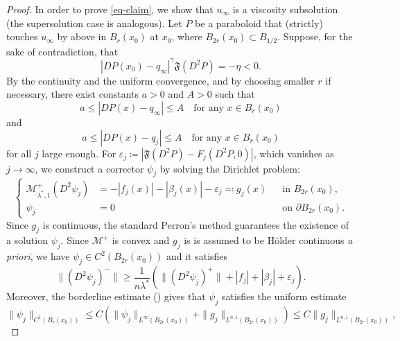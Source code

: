 \documentclass[11pt]{amsart}
\theoremstyle{plain}
\theoremstyle{definition}
\numberwithin{equation}{section}
\begin{document}
\begin{proof}
    In order to prove \eqref{eq-claim}, we show that $u_{\infty}$ is a viscosity subsolution (the supersolution case is analogous).
    Let $P$ be a paraboloid that (strictly) touches $u_{\infty}$ by above in $B_r(x_0)$ at $x_0$, where $B_{2r}(x_0) \subset B_{1/2}$. Suppose, for the sake of contradiction, that
    \begin{equation*}
        |DP(x_0)-q_{\infty}|^{\gamma}\mathfrak{F}(D^2P)=-\eta <0.
    \end{equation*}
     By the continuity and the uniform convergence, and by choosing smaller $r$ if necessary, there exist constants $a>0$ and $A>0$ such that 
        \begin{equation*}
           a \leq  |DP(x)-q_{\infty}| \leq A \quad \text{for any $x \in B_r(x_0)$}
        \end{equation*}
        and
        \begin{equation*}
           a \leq  |DP(x)-q_{j}| \leq A \quad \text{for any $x \in B_r(x_0)$}
        \end{equation*}
    for all $j$ large enough.
    For $\varepsilon_j \coloneqq |\mathfrak{F}(D^2P)-F_j(D^2P, 0)|$, which vanishes as $j \to \infty$, we construct a corrector $\psi_j$ by solving the Dirichlet problem:
    \begin{equation*}
    \left\{
        \begin{aligned}
            \mathcal{M}^+_{\lambda^{\ast}, 1}(D^2\psi_j)&=-|f_j(x)|-|\beta_{j}(x)|-\varepsilon_j\eqqcolon g_j(x) &&\text{in $B_{2r}(x_0)$},\\
            \psi_j&=0 && \text{on $\partial B_{2r}(x_0)$}.
        \end{aligned}
        \right.
    \end{equation*}
    Since $g_j$ is continuous, the standard Perron's method guarantees the existence of a solution $\psi_j$. Since $\mathcal{M}^+$ is convex and $g_j$ is is assumed to be H\"older continuous \textit{a priori}, we have $\psi_j \in C^2(B_{2r}(x_0))$ and it satisfies
    \begin{equation*}
        \|(D^2\psi_j)^-\| \geq \frac{1}{n\lambda^{\ast}} \left(\|(D^2\psi_j)^+\|+|f_j|+|\beta_j|+\varepsilon_j \right).
    \end{equation*}
    Moreover, the borderline estimate (\cite[Theorem~1.2 and Theorem~2.1]{DKM14}) gives that $\psi_j$ satisfies the uniform estimate 
    \begin{equation*}
        \|\psi_j\|_{C^1(B_{r}(x_0))} \leq C(\|\psi_j\|_{L^{\infty}(B_{2r}(x_0))}+\|g_j\|_{L^{n,1}(B_{2r}(x_0))}) \leq C\|g_j\|_{L^{n,1}(B_{2r}(x_0))},

\end{equation*}
\end{proof}
\end{document}
